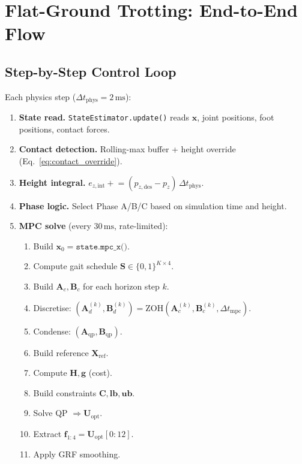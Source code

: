 \documentclass[12pt,a4paper]{report}
\newcommand{\vect}[1]{\bm{#1}}
\newcommand{\mat}[1]{\mathbf{#1}}
\begin{document}
\chapter{Flat-Ground Trotting: End-to-End Flow}

\section{Step-by-Step Control Loop}

Each physics step ($\Delta t_\text{phys} = 2\,\text{ms}$):

\begin{enumerate}
    \item \textbf{State read.} \texttt{StateEstimator.update()} reads
          $\vect{x}$, joint positions, foot positions, contact forces.

    \item \textbf{Contact detection.} Rolling-max buffer + height override
          (Eq.~\ref{eq:contact_override}).

    \item \textbf{Height integral.}
          $e_{z,\text{int}} \mathrel{+}= (p_{z,\text{des}} - p_z)\,\Delta t_\text{phys}$.

    \item \textbf{Phase logic.} Select Phase A/B/C based on simulation time
          and height.

    \item \textbf{MPC solve} (every $30\,\text{ms}$, rate-limited):
        \begin{enumerate}
            \item Build $\vect{x}_0 = \texttt{state.mpc\_x()}$.
            \item Compute gait schedule $\mat{S} \in \{0,1\}^{K\times4}$.
            \item Build $\mat{A}_c, \mat{B}_c$ for each horizon step $k$.
            \item Discretise: $(\mat{A}_d^{(k)}, \mat{B}_d^{(k)}) =
                  \text{ZOH}(\mat{A}_c^{(k)}, \mat{B}_c^{(k)}, \Delta t_\text{mpc})$.
            \item Condense: $(\mat{A}_\text{qp}, \mat{B}_\text{qp})$.
            \item Build reference $\mat{X}_\text{ref}$.
            \item Compute $\mat{H}, \vect{g}$ (cost).
            \item Build constraints $\mat{C}, \vect{lb}, \vect{ub}$.
            \item Solve QP $\Rightarrow \mat{U}_\text{opt}$.
            \item Extract $\vect{f}_{1:4} = \mat{U}_\text{opt}[0\!:\!12]$.
            \item Apply GRF smoothing.
        \end{enumerate}


\end{enumerate}
\end{document}
